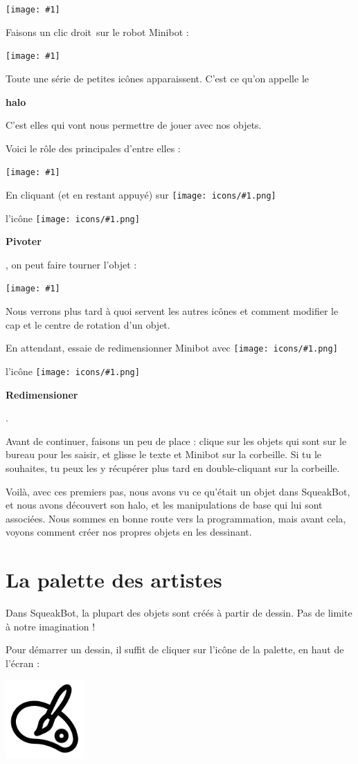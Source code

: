 \documentclass[a4paper,12pt]{book}
\def\appName{SqueakBot}
\def\cd{clic droit~}
\newcommand{\capture}[1]
{
\begin{center}
	\texttt{[image: \#1]}
\end{center}
}
\newcommand{\important}[1]
{
\textbf{#1}
}
\newcommand{\motcle}[2]
{
\important{\gls{#1}}
}
\newcommand{\inserticon}[1]
{
\texttt{[image: icons/\#1.png]}
}
\newcommand{\icon}[2][]
{
\ifthenelse {\equal{#1} {}} {\inserticon{#2}} {l'icône \inserticon{#2} \important{#1}}
}
\begin{document}
\capture{2.png}

Faisons un \cd sur le robot Minibot :
\capture{1.png}

Toute une série de petites icônes apparaissent. C'est ce qu'on appelle le \motcle{halo}. C'est elles qui vont nous permettre de jouer avec nos objets.

Voici le rôle des principales d'entre elles :

\capture{3.png}

En cliquant (et en restant appuyé) sur\icon[Pivoter]{pivoter}, on peut faire tourner l'objet :

\capture{4.png}

Nous verrons plus tard à quoi servent les autres icônes et comment modifier le cap et le centre de rotation d'un objet.

En attendant, essaie de redimensionner Minibot avec \icon[Redimensioner]{redimensionner}.

Avant de continuer, faisons un peu de place : clique sur les objets qui sont sur le bureau pour les saisir, et glisse le texte et Minibot sur la corbeille. Si tu le souhaites, tu peux les y récupérer plus tard en double-cliquant sur la corbeille.

Voilà, avec ces premiers pas, nous avons vu ce qu'était un objet dans \appName, et nous avons découvert son halo, et les manipulations de base qui lui sont associées. Nous sommes en bonne route vers la programmation, mais avant cela, voyons comment créer nos propres objets en les dessinant.

\section{La palette des artistes}

Dans \appName, la plupart des objets sont créés à partir de dessin. Pas de limite à notre imagination !

Pour démarrer un dessin, il suffit de cliquer sur l'icône de la palette, en haut de l'écran :

\begin{center}
    \includegraphics[width=3cm]{palette.png}
\end{center}
\end{document}
